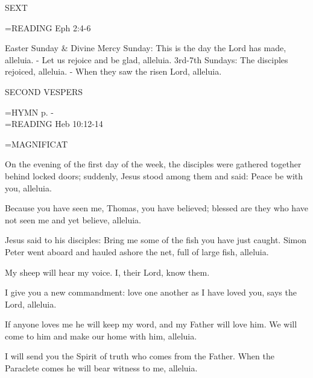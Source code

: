 \begin{flushleft}\normalsize SEXT\\\end{flushleft}
\hangindent=\parindent \small{\uppercase{READING}}    Eph 2:4-6 \textbf{   \\}

Easter Sunday \& Divine Mercy Sunday:	This is the day the Lord has made, alleluia.
						- Let us rejoice and be glad, alleluia.
3rd-7th Sundays:	The disciples rejoiced, alleluia.
			- When they saw the risen Lord, alleluia.

\begin{flushleft}\normalsize SECOND VESPERS\\\end{flushleft}
\hangindent=\parindent \small{\uppercase{HYMN} p. \pageref{easter:firstHymn}-\pageref{easter:lastHymn}\\}
\hangindent=\parindent \small{\uppercase{READING}}    Heb 10:12-14 \textbf{   \\}

\hangindent=\parindent \small MAGNIFICAT
\begin{description}[labelindent=\parindent, leftmargin=*]
\item [Easter Sunday:] 	On the evening of the first day of the week, the disciples were gathered together behind locked doors; suddenly, Jesus stood among them and said: Peace be with you, alleluia.
\item [Divine Mercy Sunday:] 	Because you have seen me, Thomas, you have believed; blessed are they who have not seen me and yet believe, alleluia.
\item [3rd Sunday:] 		Jesus said to his disciples: Bring me some of the fish you have just caught. Simon Peter went aboard and hauled ashore the net, full of large fish, alleluia.
\item [4th Sunday:] 		My sheep will hear my voice. I, their Lord, know them.
\item [5th Sunday:] 		I give you a new commandment: love one another as I have loved you, says the Lord, alleluia.
\item [6th Sunday:] 		If anyone loves me he will keep my word, and my Father will love him. We will come to him and make our home with him, alleluia.
\item [7th Sunday:] 		I will send you the Spirit of truth who comes from the Father. When the Paraclete comes he will bear witness to me, alleluia.
\end{description}


